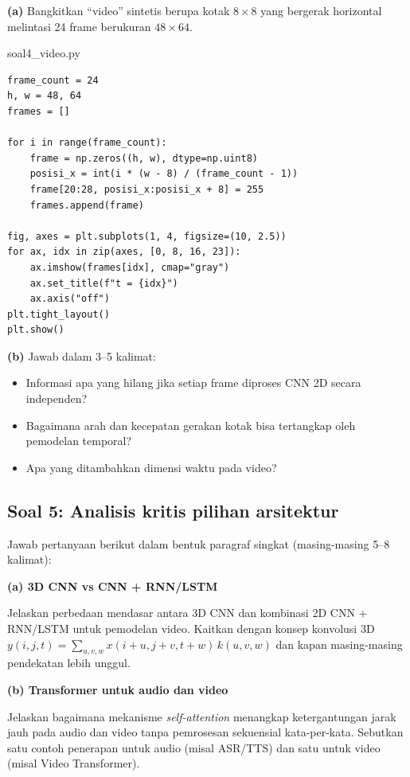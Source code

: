 \documentclass[12pt, a4paper]{article}
\begin{document}
\textbf{(a)} Bangkitkan ``video'' sintetis berupa kotak $8\times8$ yang bergerak horizontal melintasi 24 frame berukuran $48\times64$.

\begin{codewindow}{soal4\_video.py}
\begin{lstlisting}[style=pycode]
frame_count = 24
h, w = 48, 64
frames = []

for i in range(frame_count):
    frame = np.zeros((h, w), dtype=np.uint8)
    posisi_x = int(i * (w - 8) / (frame_count - 1))
    frame[20:28, posisi_x:posisi_x + 8] = 255
    frames.append(frame)

fig, axes = plt.subplots(1, 4, figsize=(10, 2.5))
for ax, idx in zip(axes, [0, 8, 16, 23]):
    ax.imshow(frames[idx], cmap="gray")
    ax.set_title(f"t = {idx}")
    ax.axis("off")
plt.tight_layout()
plt.show()
\end{lstlisting}
\end{codewindow}

\textbf{(b)} Jawab dalam 3--5 kalimat:
\begin{itemize}
  \item Informasi apa yang hilang jika setiap frame diproses CNN 2D secara independen?
  \item Bagaimana arah dan kecepatan gerakan kotak bisa tertangkap oleh pemodelan temporal?
  \item Apa yang ditambahkan dimensi waktu pada video?
\end{itemize}

\subsection{Soal 5: Analisis kritis pilihan arsitektur}
\label{sec:soal5}

Jawab pertanyaan berikut dalam bentuk paragraf singkat (masing-masing 5--8 kalimat):

\textbf{(a) 3D CNN vs CNN + RNN/LSTM}

Jelaskan perbedaan mendasar antara 3D CNN dan kombinasi 2D CNN + RNN/LSTM untuk pemodelan video. Kaitkan dengan konsep konvolusi 3D $y(i,j,t)=\sum_{u,v,w}x(i+u,j+v,t+w)\,k(u,v,w)$ dan kapan masing-masing pendekatan lebih unggul.

\textbf{(b) Transformer untuk audio dan video}

Jelaskan bagaimana mekanisme \emph{self-attention} menangkap ketergantungan jarak jauh pada audio dan video tanpa pemrosesan sekuensial kata-per-kata. Sebutkan satu contoh penerapan untuk audio (misal ASR/TTS) dan satu untuk video (misal Video Transformer).
\end{document}
